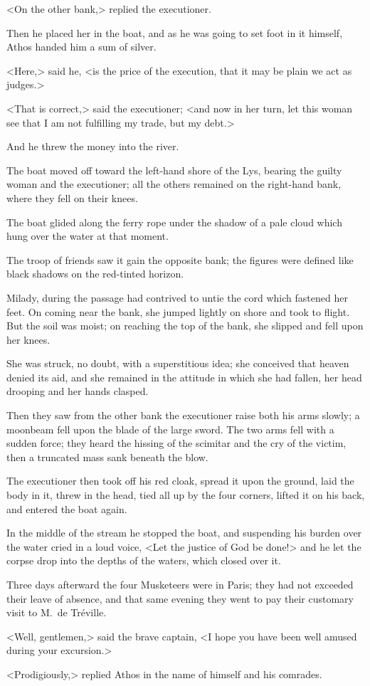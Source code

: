 <On the other bank,> replied the executioner. 

Then he placed her in the boat, and as he was going to set foot in it himself, Athos handed him a sum of silver. 

<Here,> said he, <is the price of the execution, that it may be plain we act as judges.> 

<That is correct,> said the executioner; <and now in her turn, let this woman see that I am not fulfilling my trade, but my debt.> 

And he threw the money into the river. 

The boat moved off toward the left-hand shore of the Lys, bearing the guilty woman and the executioner; all the others remained on the right-hand bank, where they fell on their knees. 

The boat glided along the ferry rope under the shadow of a pale cloud which hung over the water at that moment. 

The troop of friends saw it gain the opposite bank; the figures were defined like black shadows on the red-tinted horizon. 

Milady, during the passage had contrived to untie the cord which fastened her feet. On coming near the bank, she jumped lightly on shore and took to flight. But the soil was moist; on reaching the top of the bank, she slipped and fell upon her knees. 

She was struck, no doubt, with a superstitious idea; she conceived that heaven denied its aid, and she remained in the attitude in which she had fallen, her head drooping and her hands clasped. 

Then they saw from the other bank the executioner raise both his arms slowly; a moonbeam fell upon the blade of the large sword. The two arms fell with a sudden force; they heard the hissing of the scimitar and the cry of the victim, then a truncated mass sank beneath the blow. 

The executioner then took off his red cloak, spread it upon the ground, laid the body in it, threw in the head, tied all up by the four corners, lifted it on his back, and entered the boat again. 

In the middle of the stream he stopped the boat, and suspending his burden over the water cried in a loud voice, <Let the justice of God be done!> and he let the corpse drop into the depths of the waters, which closed over it. 

Three days afterward the four Musketeers were in Paris; they had not exceeded their leave of absence, and that same evening they went to pay their customary visit to M.~de Tréville. 

<Well, gentlemen,> said the brave captain, <I hope you have been well amused during your excursion.> 

<Prodigiously,> replied Athos in the name of himself and his comrades.